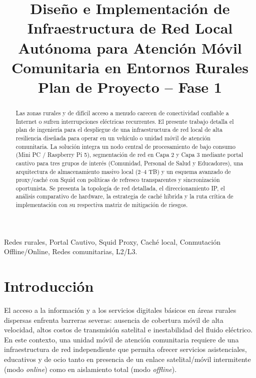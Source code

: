 \documentclass[conference]{IEEEtran}
\begin{document}
\title{Diseño e Implementación de Infraestructura de Red Local Autónoma para Atención Móvil Comunitaria en Entornos Rurales\\
\large Plan de Proyecto -- Fase 1}

\author{
}

\maketitle

\begin{abstract}
Las zonas rurales y de difícil acceso a menudo carecen de conectividad confiable a Internet o sufren interrupciones eléctricas recurrentes. El presente trabajo detalla el plan de ingeniería para el despliegue de una infraestructura de red local de alta resiliencia diseñada para operar en un vehículo o unidad móvil de atención comunitaria. La solución integra un nodo central de procesamiento de bajo consumo (Mini PC / Raspberry Pi 5), segmentación de red en Capa 2 y Capa 3 mediante portal cautivo para tres grupos de interés (Comunidad, Personal de Salud y Educadores), una arquitectura de almacenamiento masivo local (2--4 TB) y un esquema avanzado de proxy/caché con Squid con políticas de refresco transparentes y sincronización oportunista. Se presenta la topología de red detallada, el direccionamiento IP, el análisis comparativo de hardware, la estrategia de caché híbrida y la ruta crítica de implementación con su respectiva matriz de mitigación de riesgos.
\end{abstract}

\begin{IEEEkeywords}
Redes rurales, Portal Cautivo, Squid Proxy, Caché local, Conmutación Offline/Online, Redes comunitarias, L2/L3.
\end{IEEEkeywords}

\section{Introducción}
El acceso a la información y a los servicios digitales básicos en áreas rurales dispersas enfrenta barreras severas: ausencia de cobertura móvil de alta velocidad, altos costos de transmisión satelital e inestabilidad del fluido eléctrico. En este contexto, una unidad móvil de atención comunitaria requiere de una infraestructura de red independiente que permita ofrecer servicios asistenciales, educativos y de ocio tanto en presencia de un enlace satelital/móvil intermitente (modo \textit{online}) como en aislamiento total (modo \textit{offline}).
\end{document}
